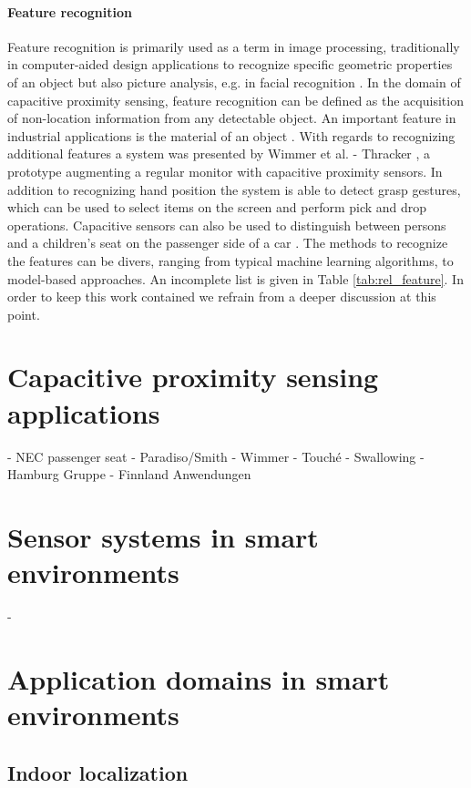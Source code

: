\paragraph{Feature recognition}
Feature recognition is primarily used as a term in image processing, traditionally in computer-aided design applications to recognize specific geometric properties of an object but also picture analysis, e.g. in facial recognition \cite{han2000manufacturing}\cite{belhumeur1997eigenfaces}. 
In the domain of capacitive proximity sensing, feature recognition can be defined as the acquisition of non-location information from any detectable object. An important feature in industrial applications is the material of an object \cite{Baxter1996}. With regards to recognizing additional features a system was presented by Wimmer et al. - Thracker \cite{Wimmer2006}, a prototype augmenting a regular monitor with capacitive proximity sensors. In addition to recognizing hand position the system is able to detect grasp gestures, which can be used to select items on the screen and perform pick and drop operations. Capacitive sensors can also be used to distinguish between persons and a children’s seat on the passenger side of a car \cite{george2009seat}. 
The methods to recognize the features can be divers, ranging from typical machine learning algorithms, to model-based approaches. An incomplete list is given in Table \ref{tab:rel_feature}. In order to keep this work contained we refrain from a deeper discussion at this point.

\section{Capacitive proximity sensing applications}
- NEC passenger seat
- Paradiso/Smith
- Wimmer
- Touché
- Swallowing
- Hamburg Gruppe
- Finnland Anwendungen
\section{Sensor systems in smart environments}
- 

\section{Application domains in smart environments}
\subsection{Indoor localization}
